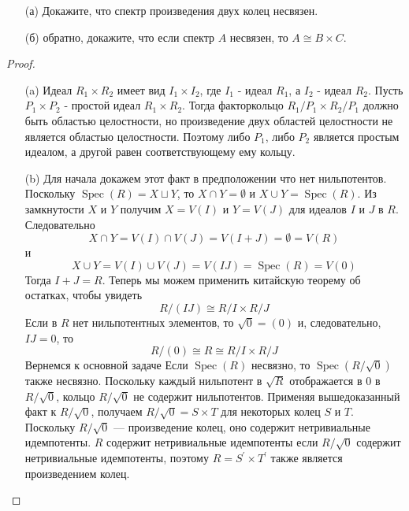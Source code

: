 \begin{prob}
\begin{itemize}
\item[]
\item[(а)] Докажите, что спектр произведения двух колец несвязен.
\item[(б)] обратно, докажите, что если спектр $A$ несвязен, то $A \cong B \times C$.
\end{itemize}
\end{prob}
\begin{proof}
\begin{itemize}
\item[]
\item[(a)]
Идеал $R_1 \times R_2$ имеет вид $I_1 \times I_2$, где $I_1$ - идеал $R_1$, а $I_2$ - идеал $R_2$. Пусть $P_1 \times P_2$ - простой идеал $R_1 \times R_2$. Тогда факторкольцо $R_1/P_1\times R_2/P_1$ должно быть областью целостности, но произведение двух областей целостности не является областью целостности. Поэтому либо $P_1$, либо $P_2$ является простым идеалом, а другой равен соответствующему ему кольцу.

\item[(b)]
Для начала докажем этот факт в предположении что нет нильпотентов.
Поскольку $\operatorname{Spec}(R)=X \sqcup Y$, то $X \cap Y=\emptyset$ и $X \cup Y=\operatorname{Spec}(R)$. Из замкнутости $X$ и $Y$ получим $X=V(I)$ и $Y=V(J)$ для идеалов $I$ и $J$ в $R$. Следовательно
$$
X \cap Y=V(I) \cap V(J)=V(I+J)=\emptyset=V(R)
$$
и
$$
X \cup Y=V(I) \cup V(J)=V(I J)=\operatorname{Spec}(R)=V(0)
$$
Тогда $I+J=R$. 
Теперь мы можем применить китайскую теорему об остатках, чтобы увидеть
$$
R /(I J) \cong R / I \times R / J
$$
Если в $R$ нет нильпотентных элементов, то $\sqrt{0}=(0)$ и, следовательно, $I J=0$, то
$$
R /(0) \cong R \cong R / I \times R / J
$$
\vskip 0.2in
Вернемся к основной задаче
Если $\operatorname{Spec}(R)$ несвязно, то $\operatorname{Spec}(R / \sqrt{0})$ также несвязно. Поскольку каждый нильпотент в $\sqrt{R}$ отображается в $0$ в $R/\sqrt{0}$, кольцо $R/\sqrt{0}$ не содержит нильпотентов. Применяя вышедоказанный факт к $R / \sqrt{0}$, получаем $R / \sqrt{0}=S \times T$ для некоторых колец $S$ и $T$. Поскольку $R / \sqrt{0}$ — произведение колец, оно содержит нетривиальные идемпотенты. $R$ содержит нетривиальные идемпотенты если $R / \sqrt{0}$ содержит нетривиальные идемпотенты, поэтому $R=S^{\prime} \times T^{\prime}$ также является произведением колец.
\end{itemize}
\end{proof}
\begin{comment}
https://math.stackexchange.com/questions/2389534/when-do-we-say-specr-is-disconnected
https://math.stackexchange.com/questions/326452/if-operatornamespec-a-is-not-connected-then-there-is-a-nontrivial-idempoten
\end{comment}
\vskip 0.6in





